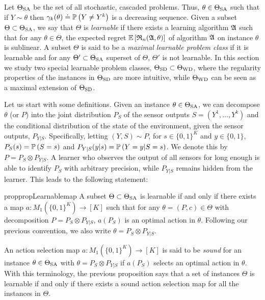 \vspace{-7pt}
Let $\Theta_{\mathrm{SA}}$ be the set of all stochastic, cascaded \ses problems. 
Thus, $\theta \in \Theta_{\mathrm{SA}}$ such that if $Y\sim \theta$ then $\gamma_k(\theta)\doteq\mathbb{P}\left(Y\ne Y^k\right)$ 
is a decreasing sequence.
Given a subset $\Theta\subset \Theta_{\mathrm{SA}}$, we say that $\Theta$ is \emph{learnable} 
if there exists a learning algorithm $\mathfrak{A}$ such that
for any $\theta\in \Theta$, the expected regret $\mathbb{E}\left[ \mathfrak{R}_n(\mathfrak{A},\theta) \right]$ 
of algorithm $\mathfrak{A}$ on instance $\theta$ is sublinear.
A subset $\Theta$ is said to be a \emph{maximal learnable problem class} 
if it is learnable and for any $\Theta'\subset \Theta_{\mathrm{SA}}$ superset
of $\Theta$, $\Theta'$ is not learnable.
In this section we study two special learnable problem classes, $\Theta_{\mathrm{SD}}\subset \Theta_{\mathrm{WD}}$, where the regularity properties of the instances in $\Theta_{\mathrm{SD}}$ are more intuitive, while $\Theta_{\mathrm{WD}}$ can be seen as a maximal extension of $\Theta_{\mathrm{SD}}$.

Let us start with some definitions.
Given an instance $\theta \in \Theta_{\mathrm{SA}}$, we can decompose $\theta$ (or $P$) into the joint distribution $P_S$ of the sensor outputs $S = (Y^1,\dots,Y^k)$ and the conditional distribution of the state of the environment, given the sensor outputs, $P_{Y|S}$.
Specifically, letting $(Y,S)\sim P$, for $s\in \{0,1\}^K$ and $y\in \{0,1\}$, $P_S(s) = \mathbb{P}\left(S = s\right)$ and $P_{Y|S}(y|s) = \mathbb{P}\left(Y=y|S=s\right)$. We denote this by $P = P_S \otimes P_{Y|S}$.
A learner who observes the output of all sensors for long enough is able to identify 
$P_S$ with arbitrary precision, while $P_{Y|S}$ remains hidden from the learner.
 This leads to the following statement:
\begin{restatable}{prop}{propLearnablemap}
\label{prop:learnablemap}
A subset $\Theta\subset \Theta_{\mathrm{SA}}$ is learnable 
if and only if there exists a map $a: M_1( \{0,1\}^K )\to [K]$ such that 
for any $\theta  = (P,c) \in \Theta$ 
with decomposition $P = P_S \otimes P_{Y|S}$, $a(P_S)$ is an optimal action in $\theta$.
Following our previous convention, we also write $\theta = P_S \otimes P_{Y|S}$.
\end{restatable}

An action selection map  $a: M_1( \{0,1\}^K ) \to [K]$ is said to be \emph{sound} for an instance 
$\theta\in \Theta_{\mathrm{SA}}$ with $\theta = P_S\otimes P_{Y|S}$ if $a(P_S)$ selects an optimal action in $\theta$.
With this terminology, the previous proposition says that a set of instances $\Theta$ is learnable if and only if there exists a
sound action selection map for all the instances in $\Theta$.

